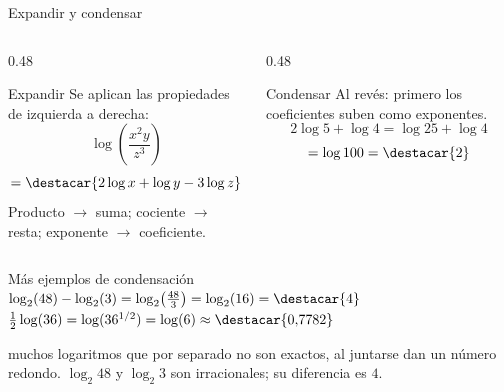 \documentclass[aspectratio=169,10pt]{beamer}
\begin{document}
\begin{frame}{Expandir y condensar}
  \scriptsize
  \begin{columns}[T,onlytextwidth]
    \begin{column}{0.48\textwidth}
      \begin{exampleblock}{Expandir}
        \tiny
        Se aplican las propiedades de izquierda a derecha:
        \[ \log\!\left(\frac{x^{2}y}{z^{3}}\right) \]
        \[ = \destacar{2\log x + \log y - 3\log z} \]
        {\color{uniGris}Producto $\to$ suma; cociente $\to$ resta; exponente
        $\to$ coeficiente.}
      \end{exampleblock}
    \end{column}
    \begin{column}{0.48\textwidth}
      \begin{exampleblock}{Condensar}
        \tiny
        Al revés: primero los coeficientes suben como exponentes.
        \[ 2\log 5 + \log 4 = \log 25 + \log 4 \]
        \[ = \log 100 = \destacar{2} \]
      \end{exampleblock}
    \end{column}
  \end{columns}

  \vspace{0.02cm}
  \begin{block}{Más ejemplos de condensación}
    \tiny
    $\log_{2}(48) - \log_{2}(3) = \log_{2}\!\left(\tfrac{48}{3}\right)
    = \log_{2}(16) = \destacar{4}$ \qquad
    $\tfrac{1}{2}\log(36) = \log(36^{1/2}) = \log(6)
    \approx \destacar{0{,}7782}$
  \end{block}

  \vspace{0.06cm}
  {\tiny\color{uniGris} 
  muchos logaritmos que por separado no son exactos, al juntarse dan un número
  redondo. $\log_2 48$ y $\log_2 3$ son irracionales; su diferencia es $4$.}
\end{frame}
\end{document}
